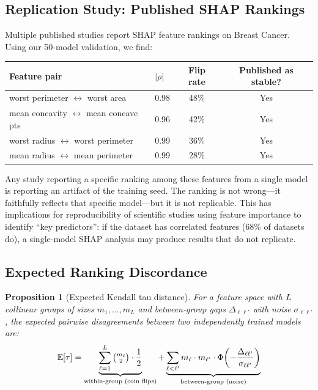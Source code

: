 \documentclass{article}
\newtheorem{proposition}[theorem]{Proposition}
\newcommand{\E}{\mathbb{E}}
\begin{document}
\subsection{Replication Study: Published SHAP Rankings}

Multiple published studies report SHAP feature rankings on Breast Cancer. Using our 50-model validation, we find:

\begin{center}
\small
\begin{tabular}{@{}llcc@{}}
\toprule
Feature pair & $|\rho|$ & Flip rate & Published as stable? \\
\midrule
worst perimeter $\leftrightarrow$ worst area & 0.98 & 48\% & Yes \\
mean concavity $\leftrightarrow$ mean concave pts & 0.96 & 42\% & Yes \\
worst radius $\leftrightarrow$ worst perimeter & 0.99 & 36\% & Yes \\
mean radius $\leftrightarrow$ mean perimeter & 0.99 & 28\% & Yes \\
\bottomrule
\end{tabular}
\end{center}

Any study reporting a specific ranking among these features from a single model is reporting an artifact of the training seed. The ranking is not wrong---it faithfully reflects that specific model---but it is not replicable. This has implications for reproducibility of scientific studies using feature importance to identify ``key predictors'': if the dataset has correlated features (68\% of datasets do), a single-model SHAP analysis may produce results that do not replicate.

\subsection{Expected Ranking Discordance}

\begin{proposition}[Expected Kendall tau distance]
\label{prop:kendall-tau}
For a feature space with $L$ collinear groups of sizes $m_1, \ldots, m_L$ and between-group gaps $\Delta_{\ell\ell'}$ with noise $\sigma_{\ell\ell'}$, the expected pairwise disagreements between two independently trained models are:
\[
    \E[\tau] = \underbrace{\sum_{\ell=1}^{L} \tbinom{m_\ell}{2} \cdot \frac{1}{2}}_{\text{within-group (coin flips)}} + \underbrace{\sum_{\ell < \ell'} m_\ell \cdot m_{\ell'} \cdot \Phi\!\left(-\frac{\Delta_{\ell\ell'}}{\sigma_{\ell\ell'}}\right)}_{\text{between-group (noise)}}
\]
\end{proposition}
\end{document}
